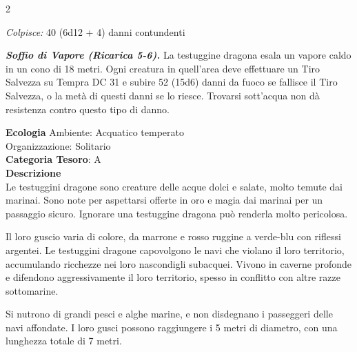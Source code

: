 \begin{multicols}{2}
{\emph{Colpisce:} 40 (6d12 + 4) danni contundenti

\emph{\textbf{Soffio di Vapore (Ricarica 5-6).}} La testuggine dragona esala un vapore caldo in un cono di 18 metri. Ogni creatura in quell'area deve effettuare un Tiro Salvezza su Tempra DC 31 e subire 52 (15d6) danni da fuoco se fallisce il Tiro Salvezza, o la metà di questi danni se lo riesce. Trovarsi sott'acqua non dà resistenza contro questo tipo di danno.

\textbf{Ecologia}
Ambiente: Acquatico temperato\\
Organizzazione: Solitario\\
\textbf{Categoria Tesoro}: A\\
\textbf{Descrizione}\\
Le testuggini dragone sono creature delle acque dolci e salate, molto temute dai marinai. Sono note per aspettarsi offerte in oro e magia dai marinai per un passaggio sicuro. Ignorare una testuggine dragona può renderla molto pericolosa.

Il loro guscio varia di colore, da marrone e rosso ruggine a verde-blu con riflessi argentei. Le testuggini dragone capovolgono le navi che violano il loro territorio, accumulando ricchezze nei loro nascondigli subacquei. Vivono in caverne profonde e difendono aggressivamente il loro territorio, spesso in conflitto con altre razze sottomarine.

Si nutrono di grandi pesci e alghe marine, e non disdegnano i passeggeri delle navi affondate. I loro gusci possono raggiungere i 5 metri di diametro, con una lunghezza totale di 7 metri.

}
\end{multicols}
